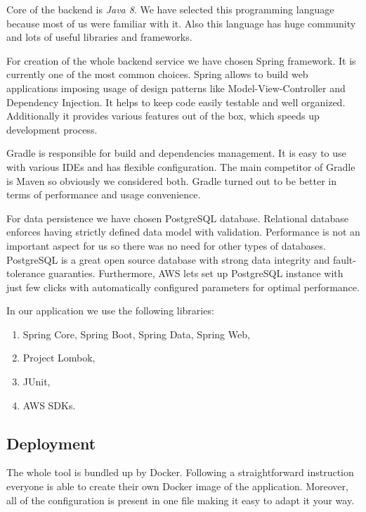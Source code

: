 \documentclass[licencjacka,en]{thesisclass}
\begin{document}
    Core of the backend is \textit{Java 8}.
    We have selected this programming language because most of us were familiar with it.
    Also this language has huge community and lots of useful libraries and frameworks.

    For creation of the whole backend service we have chosen Spring \cite{Spring} framework.
    It is currently one of the most common choices.
    Spring allows to build web applications imposing usage of design patterns like Model-View-Controller and Dependency Injection.
    It helps to keep code easily testable and well organized.
    Additionally it provides various features out of the box, which speeds up development process.

    Gradle \cite{Gradle} is responsible for build and dependencies management.
    It is easy to use with various IDEs and has flexible configuration.
    The main competitor of Gradle is Maven so obviously we considered both.
    Gradle turned out to be better in terms of performance and usage convenience.

    For data persistence we have chosen PostgreSQL database.
    Relational database enforces having strictly defined data model with validation.
    Performance is not an important aspect for us so there was no need for other types of databases.
    PostgreSQL is a great open source database with strong data integrity and fault-tolerance guaranties.
    Furthermore, AWS lets set up PostgreSQL instance with just few clicks with automatically configured parameters for optimal performance.

    In our application we use the following libraries:
    \begin{enumerate}
        \item Spring Core, Spring Boot, Spring Data, Spring Web,
        \item Project Lombok,
        \item JUnit,
        \item AWS SDKs.
    \end{enumerate}

    \subsection{Deployment}

    The whole tool is bundled up by Docker.
    Following a straightforward instruction everyone is able to create their own Docker image of the application.
    Moreover, all of the configuration is present in one file making it easy to adapt it your way.
\end{document}
